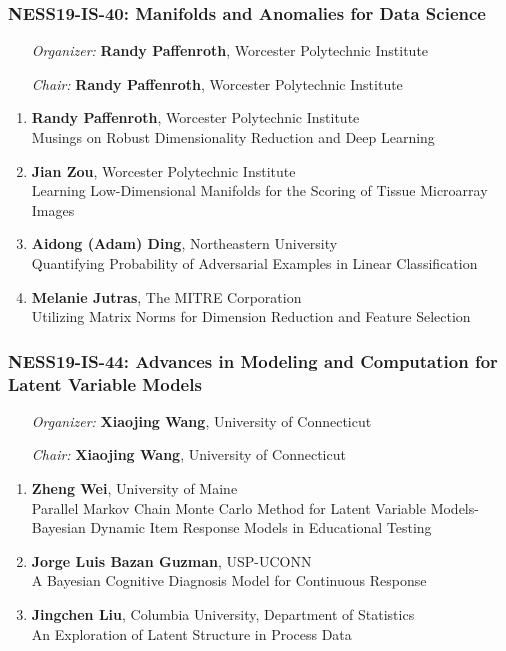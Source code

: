 \subsubsection*{NESS19-IS-40: Manifolds and Anomalies for Data Science}

\begin{enumerate}[align=left]
\item [\emph{Organizer:}] \textbf{Randy Paffenroth}, Worcester Polytechnic Institute
\item [\emph{Chair:}] \textbf{Randy Paffenroth}, Worcester Polytechnic Institute
\end{enumerate}

\begin{enumerate}
\item \textbf{Randy Paffenroth}, Worcester Polytechnic Institute \\
Musings on Robust Dimensionality Reduction and Deep Learning
\item \textbf{Jian Zou}, Worcester Polytechnic Institute \\
Learning Low-Dimensional Manifolds for the Scoring of Tissue Microarray Images
\item \textbf{Aidong (Adam) Ding}, Northeastern University \\
Quantifying Probability of Adversarial Examples in Linear Classification
\item \textbf{Melanie Jutras}, The MITRE Corporation \\
Utilizing Matrix Norms for Dimension Reduction and Feature Selection
\end{enumerate}

\subsubsection*{NESS19-IS-44: Advances in Modeling and Computation for Latent Variable Models}

\begin{enumerate}[align=left]
\item [\emph{Organizer:}] \textbf{Xiaojing Wang}, University of Connecticut
\item [\emph{Chair:}] \textbf{Xiaojing Wang}, University of Connecticut
\end{enumerate}

\begin{enumerate}
\item \textbf{Zheng Wei}, University of Maine \\
Parallel Markov Chain Monte Carlo Method for Latent Variable Models-Bayesian Dynamic Item Response Models in Educational Testing
\item \textbf{Jorge Luis Bazan Guzman}, USP-UCONN \\
A Bayesian Cognitive Diagnosis Model for Continuous Response
\item \textbf{Jingchen Liu}, Columbia University, Department of Statistics \\
An Exploration of Latent Structure in Process Data
\end{enumerate}

